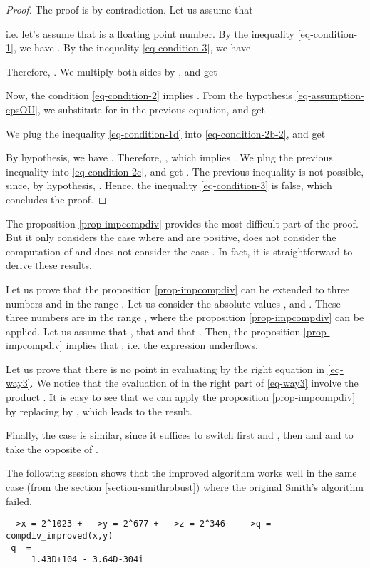 \documentclass{paper}
\begin{document}
\begin{proof}
The proof is by contradiction. 
Let us assume that

i.e. let's assume that  is a floating point number. 
By the inequality \ref{eq-condition-1}, we have 
. 
By the inequality \ref{eq-condition-3}, we have 

Therefore, . 
We multiply both sides by , and get

Now, the condition \ref{eq-condition-2} implies 
.
From the hypothesis \ref{eq-assumption-epsOU}, we substitute 
for  in the previous equation, and get

We plug the inequality \ref{eq-condition-1d} into  
\ref{eq-condition-2b-2}, and get

By hypothesis, we have . 
Therefore, , 
which implies . 
We plug the previous inequality into \ref{eq-condition-2c}, and get
.
The previous inequality is not possible, since, by hypothesis, 
. 
Hence, the inequality \ref{eq-condition-3} is false, 
which concludes the proof.
\end{proof}

The proposition \ref{prop-impcompdiv} provides the most difficult 
part of the proof. 
But it only considers the case where  and  are positive, 
does not consider the computation of  and 
does not consider the case .
In fact, it is straightforward to derive these results. 

Let us prove that the proposition \ref{prop-impcompdiv} 
can be extended to three numbers  and  in the range . 
Let us consider the absolute values ,  and . 
These three numbers are in the range , where the proposition 
\ref{prop-impcompdiv} can be applied. 
Let us assume that , that  and that 
. 
Then, the proposition \ref{prop-impcompdiv} implies that 
, i.e. the expression  underflows.

Let us prove that there is no point 
in evaluating  by the right equation in \ref{eq-way3}.
We notice that the evaluation of  in the right 
part of \ref{eq-way3} involve the product .
It is easy to see that we can apply the proposition \ref{prop-impcompdiv} 
by replacing  by , which leads to the result. 

Finally, the case  is similar, since it suffices to switch first 
 and , then  and  and to take the opposite of . 

The following session shows that the improved algorithm works well in the 
same case (from the section \ref{section-smithrobust}) where the original 
Smith's algorithm failed.
\lstset{language=scilabscript}
\begin{lstlisting}
-->x = 2^1023 + -->y = 2^677 + -->z = 2^346 - -->q = compdiv_improved(x,y)
 q  =
     1.43D+104 - 3.64D-304i 
\end{lstlisting}
\end{document}
